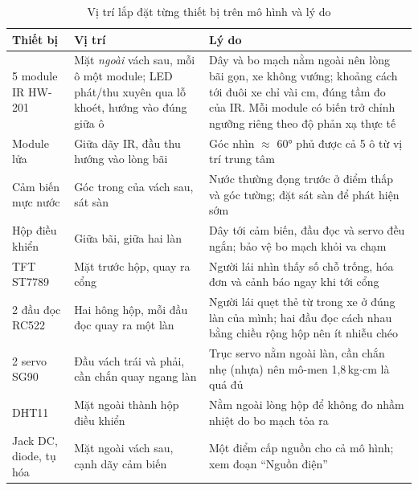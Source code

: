 \begin{table}[H]
\centering\small
\caption{Vị trí lắp đặt từng thiết bị trên mô hình và lý do}\label{tab:placement}
\begin{tabularx}{\linewidth}{@{}p{3.1cm}p{4.3cm}X@{}}
\toprule
\textbf{Thiết bị} & \textbf{Vị trí} & \textbf{Lý do} \\ \midrule
5 module IR HW-201 & Mặt \emph{ngoài} vách sau, mỗi ô một module; LED phát/thu xuyên qua lỗ khoét, hướng vào đúng giữa ô & Dây và bo mạch nằm ngoài nên lòng bãi gọn, xe không vướng; khoảng cách tới đuôi xe chỉ vài cm, đúng tầm đo của IR. Mỗi module có biến trở chỉnh ngưỡng riêng theo độ phản xạ thực tế \\
Module lửa & Giữa dãy IR, đầu thu hướng vào lòng bãi & Góc nhìn $\approx$ 60° phủ được cả 5 ô từ vị trí trung tâm \\
Cảm biến mực nước & Góc trong của vách sau, sát sàn & Nước thường đọng trước ở điểm thấp và góc tường; đặt sát sàn để phát hiện sớm \\
Hộp điều khiển & Giữa bãi, giữa hai làn & Dây tới cảm biến, đầu đọc và servo đều ngắn; bảo vệ bo mạch khỏi va chạm \\
TFT ST7789 & Mặt trước hộp, quay ra cổng & Người lái nhìn thấy số chỗ trống, hóa đơn và cảnh báo ngay khi tới cổng \\
2 đầu đọc RC522 & Hai hông hộp, mỗi đầu đọc quay ra một làn & Người lái quẹt thẻ từ trong xe ở đúng làn của mình; hai đầu đọc cách nhau bằng chiều rộng hộp nên ít nhiễu chéo \\
2 servo SG90 & Đầu vách trái và phải, cần chắn quay ngang làn & Trục servo nằm ngoài làn, cần chắn nhẹ (nhựa) nên mô-men 1,8\,kg$\cdot$cm là quá đủ \\
DHT11 & Mặt ngoài thành hộp điều khiển & Nằm ngoài lòng hộp để không đo nhầm nhiệt do bo mạch tỏa ra \\
Jack DC, diode, tụ hóa & Mặt ngoài vách sau, cạnh dãy cảm biến & Một điểm cấp nguồn cho cả mô hình; xem đoạn ``Nguồn điện'' \\
\bottomrule
\end{tabularx}
\end{table}


